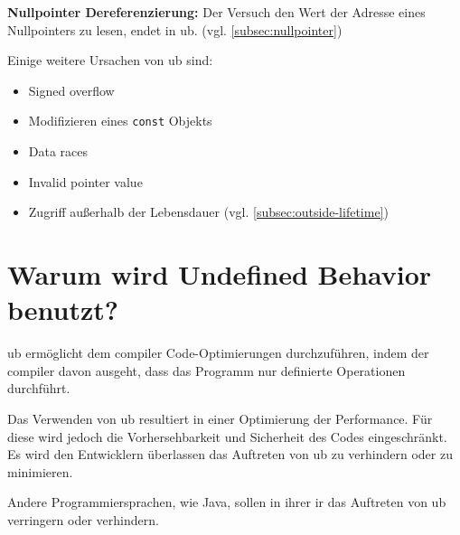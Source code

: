 \textbf{Nullpointer Dereferenzierung:} Der Versuch den Wert der Adresse eines Nullpointers zu lesen, endet in \gls{ub}. \cite[S.188]{book:cpp-standard} (vgl. \ref{subsec:nullpointer})

Einige weitere Ursachen von \gls{ub} sind:
\begin{itemize}
    \item Signed overflow \cite[S.74]{book:cpp-standard}
    \item Modifizieren eines \verb|const| Objekts \cite[S.174]{book:cpp-standard}
    \item Data races \cite[S.1376]{book:cpp-standard}
    \item Invalid pointer value \cite[S.67]{book:cpp-standard}
    \item Zugriff außerhalb der Lebensdauer \cite[S.35]{book:cpp-standard} (vgl. \ref{subsec:outside-lifetime})
\end{itemize}

\section{Warum wird Undefined Behavior benutzt?}
\label{sec:ub_warum}

\gls{ub} ermöglicht dem \gls{compiler} Code-Optimierungen durchzuführen, indem der \gls{compiler} davon ausgeht, dass das Programm nur definierte Operationen durchführt. \cite[S.633]{book:taming-ub}

Das Verwenden von \gls{ub} resultiert in einer Optimierung der Performance. Für diese wird jedoch die Vorhersehbarkeit und Sicherheit des Codes eingeschränkt. \cite[S.633]{book:taming-ub} \\
Es wird den Entwicklern überlassen das Auftreten von \gls{ub} zu verhindern oder zu minimieren.

Andere Programmiersprachen, wie Java, sollen in ihrer \gls{ir} das Auftreten von \gls{ub} verringern oder verhindern. \cite[S.633]{book:taming-ub}